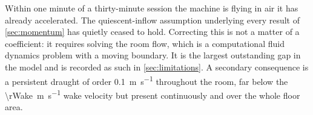 \begin{finding}
Within one minute of a thirty-minute session the machine is flying in air it
has already accelerated. The quiescent-inflow assumption underlying every
result of \cref{sec:momentum} has quietly ceased to hold. Correcting this is
not a matter of a coefficient: it requires solving the room flow, which is a
computational fluid dynamics problem with a moving boundary. It is the largest
outstanding gap in the model and is recorded as such in
\cref{sec:limitations}. A secondary consequence is a persistent draught of
order \SI{0.1}{\metre\per\second} throughout the room, far below the
\SI{\rWake}{\metre\per\second} wake velocity but present continuously and over the
whole floor area.
\end{finding}
